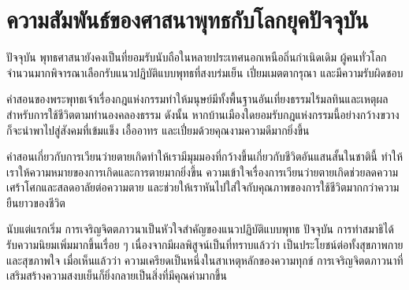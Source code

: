 \documentclass[12pt, openany]{book}
\begin{document}
\chapter*{ความ{\wbr}สัมพันธ์{\wbr}ของ{\wbr}ศาสนา{\wbr}พุทธ{\wbr}กับ{\wbr}โลก{\wbr}ยุค{\wbr}ปัจจุบัน}

ปัจจุบัน พุทธ{\wbr}ศาสนา{\wbr}ยัง{\wbr}คง{\wbr}เป็น{\wbr}ที่{\wbr}ยอมรับ{\wbr}นับถือ{\wbr}ใน{\wbr}หลาย{\wbr}ประเทศ{\wbr}นอกเหนือ{\wbr}ถิ่น{\wbr}กำเนิด{\wbr}เดิม  ผู้คน{\wbr}ทั่ว{\wbr}โลก{\wbr}จำนวน{\wbr}มาก{\wbr}พิจารณา{\wbr}เลือก{\wbr}รับ{\wbr}แนว{\wbr}ปฏิบัติ{\wbr}แบบ{\wbr}พุทธ{\wbr}ที่{\wbr}สงบ{\wbr}ร่มเย็น เปี่ยม{\wbr}เมตตา{\wbr}กรุณา และ{\wbr}มี{\wbr}ความ{\wbr}รับผิดชอบ{\wbr}

คำ{\wbr}สอน{\wbr}ของ{\wbr}พระพุทธเจ้า{\wbr}เรื่อง{\wbr}กฎ{\wbr}แห่ง{\wbr}กรรม{\wbr}ทำให้{\wbr}มนุษย์{\wbr}มี{\wbr}ทั้ง{\wbr}พื้นฐาน{\wbr}อัน{\wbr}เที่ยงธรรม{\wbr}ไร้{\wbr}มลทิน{\wbr}และ{\wbr}เหตุผล{\wbr}สำหรับ{\wbr}การ{\wbr}ใช้{\wbr}ชีวิต{\wbr}ตาม{\wbr}ทำนอง{\wbr}คลอง{\wbr}ธรรม  ดังนั้น หาก{\wbr}บ้านเมือง{\wbr}ใด{\wbr}ยอมรับ{\wbr}กฎ{\wbr}แห่ง{\wbr}กรรม{\wbr}นี้{\wbr}อย่าง{\wbr}กว้าง{\wbr}ขวาง{\wbr}ก็{\wbr}จะ{\wbr}นำพา{\wbr}ไป{\wbr}สู่{\wbr}สังคม{\wbr}ที่{\wbr}เข้มแข็ง เอื้อ{\wbr}อาทร และ{\wbr}เปี่ยม{\wbr}ด้วย{\wbr}คุณ{\wbr}งาม{\wbr}ความ{\wbr}ดี{\wbr}มาก{\wbr}ยิ่ง{\wbr}ขึ้น 

คำ{\wbr}สอน{\wbr}เกี่ยว{\wbr}กับ{\wbr}การ{\wbr}เวียน{\wbr}ว่าย{\wbr}ตาย{\wbr}เกิด{\wbr}ทำให้{\wbr}เรา{\wbr}มี{\wbr}มุมมอง{\wbr}ที่{\wbr}กว้าง{\wbr}ขึ้น{\wbr}เกี่ยว{\wbr}กับ{\wbr}ชีวิต{\wbr}อัน{\wbr}แสน{\wbr}สั้น{\wbr}ใน{\wbr}ชาติ{\wbr}นี้ ทำให้{\wbr}เรา{\wbr}ให้{\wbr}ความหมาย{\wbr}ของ{\wbr}การ{\wbr}เกิด{\wbr}และ{\wbr}การ{\wbr}ตาย{\wbr}มาก{\wbr}ยิ่ง{\wbr}ขึ้น  ความ{\wbr}เข้าใจ{\wbr}เรื่อง{\wbr}การ{\wbr}เวียน{\wbr}ว่าย{\wbr}ตาย{\wbr}เกิด{\wbr}ช่วย{\wbr}ลด{\wbr}ความ{\wbr}เศร้าโศก{\wbr}และ{\wbr}สลด{\wbr}อาลัย{\wbr}ต่อ{\wbr}ความ{\wbr}ตาย และ{\wbr}ช่วย{\wbr}ให้{\wbr}เรา{\wbr}หัน{\wbr}ไป{\wbr}ใส่ใจ{\wbr}กับ{\wbr}คุณภาพ{\wbr}ของ{\wbr}การ{\wbr}ใช้{\wbr}ชีวิต{\wbr}มาก{\wbr}กว่า{\wbr}ความ{\wbr}ยืน{\wbr}ยาว{\wbr}ของ{\wbr}ชีวิต{\wbr}

นับ{\wbr}แต่{\wbr}แรก{\wbr}เริ่ม การ{\wbr}เจริญ{\wbr}จิตตภาวนา{\wbr}เป็น{\wbr}หัวใจ{\wbr}สำคัญ{\wbr}ของ{\wbr}แนว{\wbr}ปฏิบัติ{\wbr}แบบ{\wbr}พุทธ  ปัจจุบัน การ{\wbr}ทำ{\wbr}สมาธิ{\wbr}ได้{\wbr}รับ{\wbr}ความ{\wbr}นิยม{\wbr}เพิ่ม{\wbr}มาก{\wbr}ขึ้น{\wbr}เรื่อย ๆ เนื่อง{\wbr}จาก{\wbr}มี{\wbr}ผล{\wbr}พิสูจน์{\wbr}เป็น{\wbr}ที่{\wbr}ทราบ{\wbr}แล้ว{\wbr}ว่า เป็น{\wbr}ประโยชน์{\wbr}ต่อ{\wbr}ทั้ง{\wbr}สุขภาพ{\wbr}กาย{\wbr}และ{\wbr}สุขภาพ{\wbr}ใจ  เมื่อ{\wbr}เห็น{\wbr}แล้ว{\wbr}ว่า ความ{\wbr}เครียด{\wbr}เป็น{\wbr}หนึ่ง{\wbr}ใน{\wbr}สาเหตุ{\wbr}หลัก{\wbr}ของ{\wbr}ความ{\wbr}ทุกข์ การ{\wbr}เจริญ{\wbr}จิตตภาวนา{\wbr}ที่{\wbr}เสริมสร้าง{\wbr}ความ{\wbr}สงบ{\wbr}เย็น{\wbr}ก็{\wbr}ยิ่ง{\wbr}กลาย{\wbr}เป็น{\wbr}สิ่ง{\wbr}ที่{\wbr}มี{\wbr}คุณค่า{\wbr}มาก{\wbr}ขึ้น  
\end{document}
